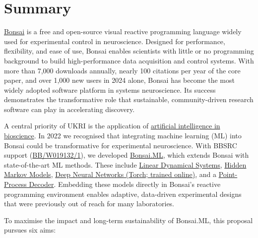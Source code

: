 \section*{Summary}

\href{https://bonsai-rx.org/}{Bonsai} is a free and open-source visual reactive
programming language widely used for experimental control in neuroscience.
Designed for performance, flexibility, and ease of use, Bonsai enables
scientists with little or no programming background to build high-performance
data acquisition and control systems. With more than 7,000 downloads annually,
nearly 100 citations per year of the core paper, and over 1,000 new users in
2024 alone, Bonsai has become the most widely adopted software platform in
systems neuroscience. Its success demonstrates the transformative role that
sustainable, community-driven research software can play in accelerating
discovery.  

A central priority of UKRI is the application of
\href{https://www.ukri.org/what-we-do/browse-our-areas-of-investment-and-support/artificial-intelligence-in-bioscience/}{artificial
intelligence in bioscience}. In 2022 we recognised that integrating machine
learning (ML) into Bonsai could be transformative for experimental
neuroscience. With BBSRC support
(\href{https://gow.bbsrc.ukri.org/grants/AwardDetails.aspx?FundingReference=BB%2FW019132%2F1}{BB/W019132/1}),
we developed \href{https://bonsai-rx.org/machinelearning/}{Bonsai.ML}, which
extends Bonsai with state-of-the-art ML methods. These include
\href{https://bonsai-rx.org/machinelearning/examples/examples/LinearDynamicalSystems/README.html}{Linear
Dynamical Systems},
\href{https://bonsai-rx.org/machinelearning/examples/examples/HiddenMarkovModels/README.html}{Hidden
Markov Models},
\href{https://bonsai-rx.org/machinelearning/examples/examples/Torch/NeuralNetsTrainedOnline/README.html}{Deep
Neural Networks (Torch; trained online)}, and a
\href{https://bonsai-rx.org/machinelearning/examples/examples/PointProcessDecoder/DecodePositionFromHippocampusSortedUnits/README.html}{Point-Process
Decoder}. Embedding these models directly in Bonsai’s reactive programming
environment enables adaptive, data-driven experimental designs that were
previously out of reach for many laboratories.  

To maximise the impact and long-term sustainability of Bonsai.ML, this proposal
pursues six aims:  

